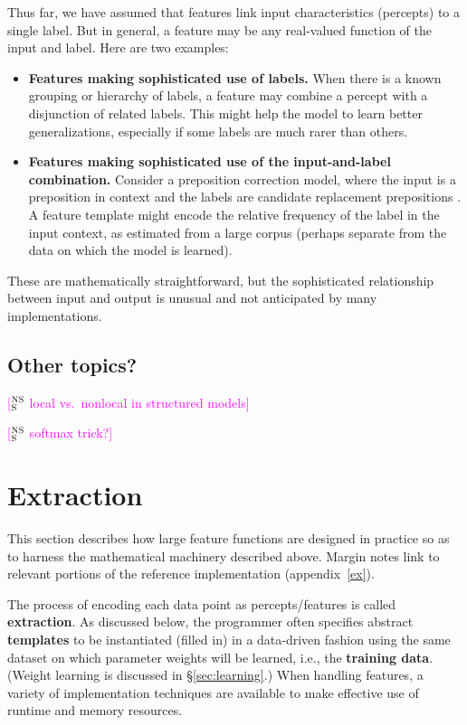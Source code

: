 \documentclass[11pt,letterpaper]{article}
\newcommand{\ensuretext}[1]{#1}
\newcommand{\nssmarker}{\ensuretext{\textcolor{magenta}{\ensuremath{^{\textsc{NS}}_{\textsc{S}}}}}}
\newcommand{\arkcomment}[3]{\ensuretext{\textcolor{#3}{[#1 #2]}}}
\newcommand{\nss}[1]{\arkcomment{\nssmarker}{#1}{magenta}}
\newcommand{\Sref}[1]{\S\ref{#1}}
\newcommand{\appref}[1]{appendix~\ref{#1}}
\begin{document}
Thus far, we have assumed that features link input characteristics (percepts) 
to a single label. But in general, a feature may be any real-valued function of the input and label.
Here are two examples:

\begin{itemize}
\item \textbf{Features making sophisticated use of labels.} 
When there is a known grouping or hierarchy of labels, a feature may combine a percept 
with a disjunction of related labels. This might help the model to learn better generalizations, 
especially if some labels are much rarer than others.

\item \textbf{Features making sophisticated use of the input-and-label combination.}
Consider a preposition correction model, where the input is a preposition in context 
and the labels are candidate replacement prepositions \citep[as in][]{han-10}. 
A feature template might encode the relative frequency of the label in the input context, 
as estimated from a large corpus (perhaps separate from the data on which the model is learned).
\end{itemize}

These are mathematically straightforward, but the sophisticated relationship between input and output 
is unusual and not anticipated by many implementations.

\subsection{Other topics?}

\nss{local vs.~nonlocal in structured models}

\nss{softmax trick?}

\section{Extraction}\label{sec:extraction}

This section describes how large feature functions are designed in practice
so as to harness the mathematical machinery described above.
Margin notes link to relevant portions of the reference implementation (\appref{ex}).

The process of encoding 
each data point as percepts\slash features is called \textbf{extraction}.
As discussed below, the programmer often specifies abstract \textbf{templates} 
to be instantiated (filled in) in a data-driven fashion
using the same dataset on which parameter weights will be learned, 
i.e., the \textbf{training data}. (Weight learning is discussed in \Sref{sec:learning}.)
When handling features, a variety of implementation techniques 
are available to make effective use of runtime and memory resources.
\end{document}
